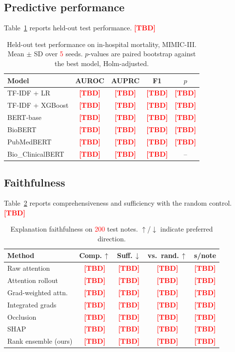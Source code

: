 \documentclass[conference]{IEEEtran}
\newif\ifdraftnums\draftnumstrue   %
\newcommand{\TBD}{\ifdraftnums\textcolor{red}{\textbf{[TBD]}}\else--\fi}
\newcommand{\ph}[1]{\ifdraftnums\textcolor{red}{#1}\else#1\fi}
\begin{document}
\subsection{Predictive performance}
Table~\ref{tab:main} reports held-out test performance. \TBD

\begin{table}[t]
\caption{Held-out test performance on in-hospital mortality, MIMIC-III.
Mean $\pm$ SD over \ph{5} seeds. $p$-values are paired bootstrap against the best
model, Holm-adjusted.}
\label{tab:main}
\centering
\begin{tabular}{lcccc}
\toprule
Model & AUROC & AUPRC & F1 & $p$ \\
\midrule
TF-IDF + LR        & \TBD & \TBD & \TBD & \TBD \\
TF-IDF + XGBoost   & \TBD & \TBD & \TBD & \TBD \\
BERT-base          & \TBD & \TBD & \TBD & \TBD \\
BioBERT            & \TBD & \TBD & \TBD & \TBD \\
PubMedBERT         & \TBD & \TBD & \TBD & \TBD \\
Bio\_ClinicalBERT  & \TBD & \TBD & \TBD & -- \\
\bottomrule
\end{tabular}
\end{table}

\subsection{Faithfulness}
Table~\ref{tab:faith} reports comprehensiveness and sufficiency with the random
control. \TBD

\begin{table}[t]
\caption{Explanation faithfulness on \ph{200} test notes.
$\uparrow$/$\downarrow$ indicate preferred direction.}
\label{tab:faith}
\centering
\begin{tabular}{lcccc}
\toprule
Method & Comp.\,$\uparrow$ & Suff.\,$\downarrow$ & vs.\ rand.\,$\uparrow$ & s/note \\
\midrule
Raw attention       & \TBD & \TBD & \TBD & \TBD \\
Attention rollout   & \TBD & \TBD & \TBD & \TBD \\
Grad-weighted attn. & \TBD & \TBD & \TBD & \TBD \\
Integrated grads    & \TBD & \TBD & \TBD & \TBD \\
Occlusion           & \TBD & \TBD & \TBD & \TBD \\
SHAP                & \TBD & \TBD & \TBD & \TBD \\
\midrule
Rank ensemble (ours)& \TBD & \TBD & \TBD & \TBD \\
\bottomrule
\end{tabular}
\end{table}
\end{document}
